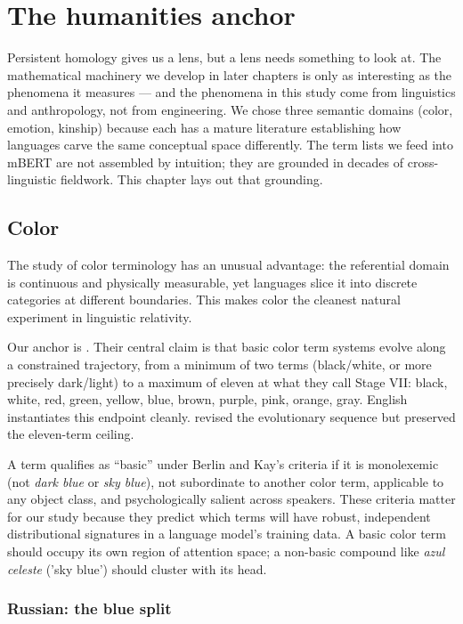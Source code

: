 \chapter{The humanities anchor}
\label{ch:humanities}

Persistent homology gives us a lens, but a lens needs something to look at. The mathematical machinery we develop in later chapters is only as interesting as the phenomena it measures --- and the phenomena in this study come from linguistics and anthropology, not from engineering. We chose three semantic domains (color, emotion, kinship) because each has a mature literature establishing how languages carve the same conceptual space differently. The term lists we feed into mBERT are not assembled by intuition; they are grounded in decades of cross-linguistic fieldwork. This chapter lays out that grounding.

\section{Color}
\label{sec:color}

The study of color terminology has an unusual advantage: the referential domain is continuous and physically measurable, yet languages slice it into discrete categories at different boundaries. This makes color the cleanest natural experiment in linguistic relativity.

Our anchor is \textcite{berlin1969}. Their central claim is that basic color term systems evolve along a constrained trajectory, from a minimum of two terms (black/white, or more precisely dark/light) to a maximum of eleven at what they call Stage VII: black, white, red, green, yellow, blue, brown, purple, pink, orange, gray. English instantiates this endpoint cleanly. \textcite{kay1999} revised the evolutionary sequence but preserved the eleven-term ceiling.

A term qualifies as ``basic'' under Berlin and Kay's criteria if it is monolexemic (not \emph{dark blue} or \emph{sky blue}), not subordinate to another color term, applicable to any object class, and psychologically salient across speakers. These criteria matter for our study because they predict which terms will have robust, independent distributional signatures in a language model's training data. A basic color term should occupy its own region of attention space; a non-basic compound like \emph{azul celeste} ('sky blue') should cluster with its head.

\subsection{Russian: the blue split}
\label{sec:russian-blue}

